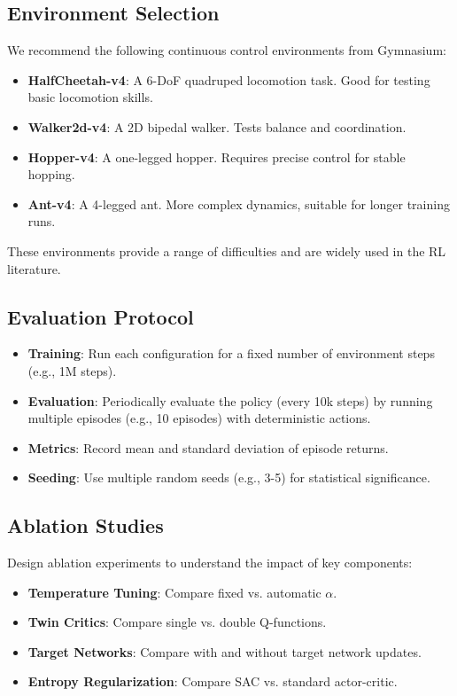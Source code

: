 \documentclass[conference]{IEEEtran}
\begin{document}
\subsection{Environment Selection}
We recommend the following continuous control environments from Gymnasium:
\begin{itemize}
  \item \textbf{HalfCheetah-v4}: A 6-DoF quadruped locomotion task. Good for testing basic locomotion skills.
  \item \textbf{Walker2d-v4}: A 2D bipedal walker. Tests balance and coordination.
  \item \textbf{Hopper-v4}: A one-legged hopper. Requires precise control for stable hopping.
  \item \textbf{Ant-v4}: A 4-legged ant. More complex dynamics, suitable for longer training runs.
\end{itemize}

These environments provide a range of difficulties and are widely used in the RL literature.

\subsection{Evaluation Protocol}
\begin{itemize}
  \item \textbf{Training}: Run each configuration for a fixed number of environment steps (e.g., 1M steps).
  \item \textbf{Evaluation}: Periodically evaluate the policy (every 10k steps) by running multiple episodes (e.g., 10 episodes) with deterministic actions.
  \item \textbf{Metrics}: Record mean and standard deviation of episode returns.
  \item \textbf{Seeding}: Use multiple random seeds (e.g., 3-5) for statistical significance.
\end{itemize}

\subsection{Ablation Studies}
Design ablation experiments to understand the impact of key components:
\begin{itemize}
  \item \textbf{Temperature Tuning}: Compare fixed vs. automatic $\alpha$.
  \item \textbf{Twin Critics}: Compare single vs. double Q-functions.
  \item \textbf{Target Networks}: Compare with and without target network updates.
  \item \textbf{Entropy Regularization}: Compare SAC vs. standard actor-critic.
\end{itemize}
\end{document}

